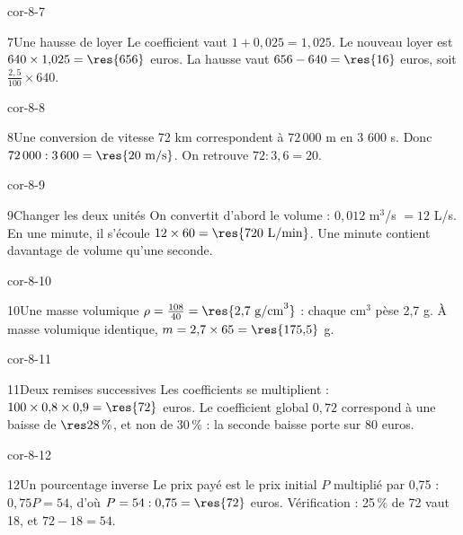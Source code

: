\begin{blocLivre}{cor-8-7}\begin{corrige}{7}{Une hausse de loyer}
Le coefficient vaut $1+0{,}025=1{,}025$. Le nouveau loyer est $640\times1{,}025=\res{656}$ euros. La hausse vaut $656-640=\res{16}$ euros, soit $\frac{2{,}5}{100}\times640$.
\end{corrige}\end{blocLivre}
\begin{blocLivre}{cor-8-8}\begin{corrige}{8}{Une conversion de vitesse}
72 km correspondent à $72\,000$ m en 3 600 s. Donc $72\,000:3\,600=\res{20\ \mathrm{m/s}}$. On retrouve $72:3{,}6=20$.
\end{corrige}\end{blocLivre}
\begin{blocLivre}{cor-8-9}\begin{corrige}{9}{Changer les deux unités}
On convertit d’abord le volume : $0{,}012$ m$^3$/s $=12$ L/s. En une minute, il s’écoule $12\times60=\res{720\ \mathrm{L/min}}$. Une minute contient davantage de volume qu’une seconde.
\end{corrige}\end{blocLivre}
\begin{blocLivre}{cor-8-10}\begin{corrige}{10}{Une masse volumique}
$\rho=\frac{108}{40}=\res{2{,}7\ \mathrm{g/cm}^3}$ : chaque cm$^3$ pèse 2,7 g. À masse volumique identique, $m=2{,}7\times65=\res{175{,}5}$ g.
\end{corrige}\end{blocLivre}
\begin{blocLivre}{cor-8-11}\begin{corrige}{11}{Deux remises successives}
Les coefficients se multiplient : $100\times0{,}8\times0{,}9=\res{72}$ euros. Le coefficient global $0{,}72$ correspond à une baisse de $\res{28\,\%}$, et non de 30\,\% : la seconde baisse porte sur 80 euros.
\end{corrige}\end{blocLivre}
\begin{blocLivre}{cor-8-12}\begin{corrige}{12}{Un pourcentage inverse}
Le prix payé est le prix initial $P$ multiplié par 0,75 : $0{,}75P=54$, d’où $P=54:0{,}75=\res{72}$ euros. Vérification : 25\,\% de 72 vaut 18, et $72-18=54$.
\end{corrige}\end{blocLivre}
